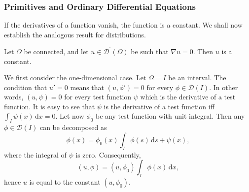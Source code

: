 \subsubsection{Primitives and Ordinary Differential Equations}\label{subsec:distribution-primitives-odes}

If the derivatives of a function vanish, the function is a constant. We shall now establish the analogous result for distributions.

\begin{Theorem}
\label{thm:distribution-zero-gradient-constant}
Let $\Omega$ be connected, and let $u\in\mathcal{D}^{\prime}(\Omega)$ be such that $\nabla u=0$. Then $u$ is a constant.
\end{Theorem}

\begin{Proof}
We first consider the one-dimensional case. Let $\Omega=I$ be an interval. The condition that $u'=0$ means that $(u,\phi')=0$ for every $\phi\in\mathcal{D}(I)$. In other words, $(u,\psi)=0$ for every test function $\psi$ which is the derivative of a test function. It is easy to see that $\psi$ is the derivative of a test function iff $\int_I\psi(x)\,\mathrm{d}x=0$. Let now $\phi_0$ be any test function with unit integral. Then any $\phi\in\mathcal{D}(I)$ can be decomposed as
\begin{equation}\label{eq:test-function-one-dimensional-zero-integral-decomposition}
\phi(x)=\phi_0(x)\int_I\phi(s)\,\mathrm{d}s+\psi(x),
\end{equation}
where the integral of $\psi$ is zero. Consequently,
\begin{equation}\label{eq:zero-derivative-distribution-constant-pairing}
(u,\phi)=(u,\phi_0)\int_I\phi(x)\,\mathrm{d}x,
\end{equation}
hence $u$ is equal to the constant $(u,\phi_0)$.


\end{Proof}
